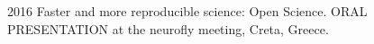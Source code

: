 {}

\begin{itemize}
\begin{sloppypar}

\item[2016] Faster and more reproducible science: Open Science. ORAL PRESENTATION at the neurofly meeting, Creta, Greece.


%



%
%
%
%
%


\end{sloppypar}
\end{itemize}
